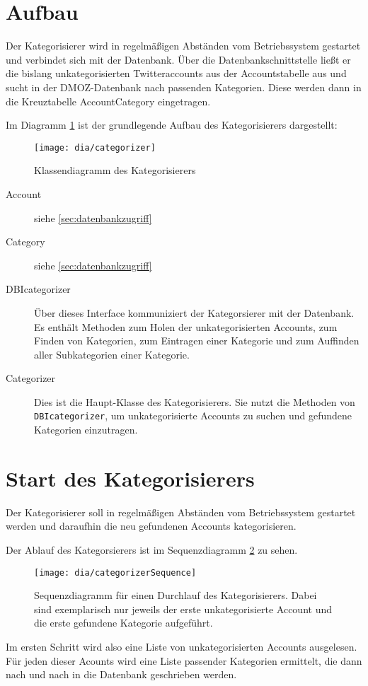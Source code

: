 \section{Aufbau}
Der Kategorisierer wird in regelmäßigen Abständen vom Betriebssystem gestartet und verbindet sich mit der Datenbank. Über die Datenbankschnittstelle ließt er die bislang unkategorisierten Twitteraccounts aus der Accountstabelle aus und sucht in der DMOZ-Datenbank nach passenden Kategorien. Diese werden dann in die Kreuztabelle AccountCategory eingetragen.

Im Diagramm \ref{fig:categorizer} ist der grundlegende Aufbau des Kategorisierers dargestellt:
\begin{figure}[h!]
	\centering
	\texttt{[image: dia/categorizer]}
	\caption{Klassendiagramm des Kategorisierers}
	\label{fig:categorizer}
\end{figure}
\begin{description}
	\item[Account] siehe \cref{sec:datenbankzugriff}
	\item[Category] siehe \cref{sec:datenbankzugriff}
	\item[DBIcategorizer] Über dieses Interface kommuniziert der Kategorsierer mit der Datenbank. Es enthält Methoden zum Holen der unkategorisierten Accounts, zum Finden von Kategorien, zum Eintragen einer Kategorie und zum Auffinden aller Subkategorien einer Kategorie.
	\item[Categorizer] Dies ist die Haupt-Klasse des Kategorisierers. Sie nutzt die Methoden von \lstinline{DBIcategorizer}, um unkategorisierte Accounts zu suchen und gefundene Kategorien einzutragen.
\end{description}

\section{Start des Kategorisierers}
Der Kategorisierer soll in regelmäßigen Abständen vom Betriebssystem gestartet werden und daraufhin die neu gefundenen Accounts kategorisieren.

Der Ablauf des Kategorsierers ist im Sequenzdiagramm \ref{fig:categorizerSeq} zu sehen.
\begin{figure}[h!]
	\centering
	\texttt{[image: dia/categorizerSequence]}
	\caption{Sequenzdiagramm für einen Durchlauf des Kategorisierers. Dabei sind exemplarisch nur jeweils der erste unkategorisierte Account und die erste gefundene Kategorie aufgeführt.}
	\label{fig:categorizerSeq}
\end{figure}

Im ersten Schritt wird also eine Liste von unkategorisierten Accounts ausgelesen. Für jeden dieser Acounts wird eine Liste passender Kategorien ermittelt, die dann nach und nach in die Datenbank geschrieben werden.
